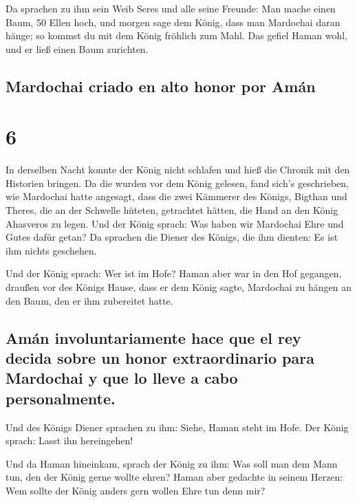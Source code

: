  Da sprachen zu ihm sein Weib Seres und alle seine
Freunde: Man mache einen Baum, 50 Ellen hoch, und morgen sage dem König,
dass man Mardochai daran hänge; so kommst du mit dem König fröhlich zum
Mahl. Das gefiel Haman wohl, und er ließ einen Baum zurichten.

\hypertarget{mardochai-criado-en-alto-honor-por-amuxe1n}{%
\subsection{Mardochai criado en alto honor por
Amán}\label{mardochai-criado-en-alto-honor-por-amuxe1n}}

\hypertarget{section-5}{%
\section{6}\label{section-5}}

 In derselben Nacht konnte der König nicht schlafen und
hieß die Chronik mit den Historien bringen. Da die wurden vor dem König
gelesen,  fand sich's geschrieben, wie Mardochai hatte
angesagt, dass die zwei Kämmerer des Königs, Bigthan und Theres, die an
der Schwelle hüteten, getrachtet hätten, die Hand an den König Ahasveros
zu legen.  Und der König sprach: Was haben wir Mardochai
Ehre und Gutes dafür getan? Da sprachen die Diener des Königs, die ihm
dienten: Es ist ihm nichts geschehen.

 Und der König sprach: Wer ist im Hofe? Haman aber war in
den Hof gegangen, draußen vor des Königs Hause, dass er dem König sagte,
Mardochai zu hängen an den Baum, den er ihm zubereitet hatte.

\hypertarget{amuxe1n-involuntariamente-hace-que-el-rey-decida-sobre-un-honor-extraordinario-para-mardochai-y-que-lo-lleve-a-cabo-personalmente.}{%
\subsection{Amán involuntariamente hace que el rey decida sobre un honor
extraordinario para Mardochai y que lo lleve a cabo
personalmente.}\label{amuxe1n-involuntariamente-hace-que-el-rey-decida-sobre-un-honor-extraordinario-para-mardochai-y-que-lo-lleve-a-cabo-personalmente.}}

 Und des Königs Diener sprachen zu ihm: Siehe, Haman steht
im Hofe. Der König sprach: Lasst ihn hereingehen!

 Und da Haman hineinkam, sprach der König zu ihm: Was soll
man dem Mann tun, den der König gerne wollte ehren? Haman aber gedachte
in seinem Herzen: Wem sollte der König anders gern wollen Ehre tun denn
mir?

